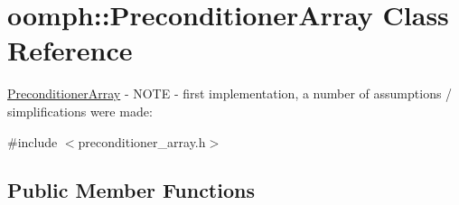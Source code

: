 \hypertarget{classoomph_1_1PreconditionerArray}{}\section{oomph\+:\+:Preconditioner\+Array Class Reference}
\label{classoomph_1_1PreconditionerArray}


\hyperlink{classoomph_1_1PreconditionerArray}{Preconditioner\+Array} -\/ N\+O\+TE -\/ first implementation, a number of assumptions / simplifications were made\+:  




{\ttfamily \#include $<$preconditioner\+\_\+array.\+h$>$}

\subsection*{Public Member Functions}
